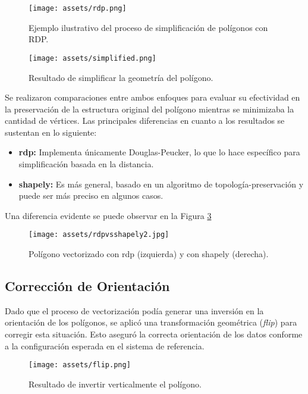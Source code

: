 \documentclass[twocolumn, fontsize=10pt]{article}
\begin{document}
\begin{figure}[H]
    \centering
    \texttt{[image: assets/rdp.png]}
    \caption{Ejemplo ilustrativo del proceso de simplificación de polígonos con RDP.}
    \label{fig:rdp}
\end{figure}

\begin{figure}[H]
    \centering
    \texttt{[image: assets/simplified.png]}
    \caption{Resultado de simplificar la geometría del polígono.}
    \label{fig:simplified}
\end{figure}

Se realizaron comparaciones entre ambos enfoques para evaluar su efectividad en la preservación de la estructura original del polígono mientras se minimizaba la cantidad de vértices. Las principales diferencias en cuanto a los resultados se sustentan en lo siguiente:

\begin{itemize}
    \item \textbf{rdp:} Implementa únicamente Douglas-Peucker, lo que lo hace específico para simplificación basada en la distancia.

\item \textbf{shapely:} Es más general, basado en un algoritmo de topología-preservación y puede ser más preciso en algunos casos.
\end{itemize}

Una diferencia evidente se puede observar en la Figura \ref{fig:rdpvsshapely}

\begin{figure}[H]
    \centering
    \texttt{[image: assets/rdpvsshapely2.jpg]}
    \caption{Polígono vectorizado con rdp (izquierda) y con shapely (derecha).}
    \label{fig:rdpvsshapely}
\end{figure}

\subsection{Corrección de Orientación}

Dado que el proceso de vectorización podía generar una inversión en la orientación de los polígonos, se aplicó una transformación geométrica (\textit{flip}) para corregir esta situación. Esto aseguró la correcta orientación de los datos conforme a la configuración esperada en el sistema de referencia.

\begin{figure}[H]
    \centering
    \texttt{[image: assets/flip.png]}
    \caption{Resultado de invertir verticalmente el polígono.}
    \label{fig:flipped}
\end{figure}
\end{document}

